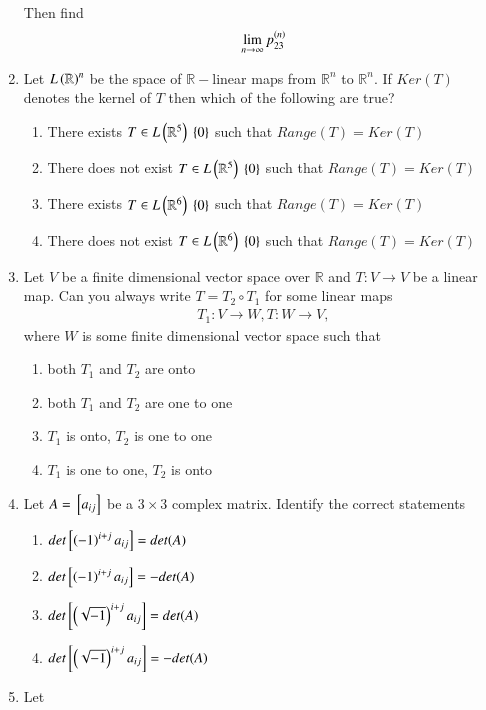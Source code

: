 \begin{enumerate}[label=\thesection.\arabic*.,ref=\thesection.\theenumi]
\begin{align}
\end{align}
Then find 
\begin{align}
\lim_{n \to \infty} p_{23}^{\left(n\right)}
\end{align}
\item Let $L\left(\mathbb{R}\right)^n$ be the space of $\mathbb{R}-$linear maps from $\mathbb{R}^n$ to $\mathbb{R}^n$.  If $Ker(T)$ denotes the kernel of $T$ then which of the following are true?
\begin{enumerate}
\item There exists $T \in L\left(\mathbb{R}^5\right)\ \left\{0\right\}$ such that $Range(T) = Ker(T)$
\item There does not exist $T \in L\left(\mathbb{R}^5\right)\ \left\{0\right\}$ such that $Range(T) = Ker(T)$
\item There exists $T \in L\left(\mathbb{R}^6\right)\ \left\{0\right\}$ such that $Range(T) = Ker(T)$
\item There does not exist $T \in L\left(\mathbb{R}^6\right)\ \left\{0\right\}$ such that $Range(T) = Ker(T)$
\end{enumerate}
\item Let $V$ be a finite dimensional vector space over $\mathbb{R}$ and $T:V\to V$ be a linear map.   Can you always write $T = T_2 \circ T_1$ for some linear maps
\begin{align}
T_1:V\to W, T:W\to V,
\end{align}
where $W$ is some finite dimensional vector space such that\begin{enumerate}
\item both $T_1$ and $T_2$ are onto
\item both $T_1$ and $T_2$ are one to one
\item $T_1$ is onto, $T_2$ is one to one
\item $T_1$ is one to one, $T_2$ is onto
\end{enumerate}
\item Let $A = {}\left[a_{ij}\right]$ be a $3\times 3$ complex matrix.  Identify the correct statements
\begin{enumerate}
\item $det{}\left[\left(-1\right)^{i+j}a_{ij}\right] = det(A)$
\item $det{}\left[\left(-1\right)^{i+j}a_{ij}\right] = -det(A)$
\item $det{}\left[\left(\sqrt{-1}\right)^{i+j}a_{ij}\right] = det(A)$
\item $det{}\left[\left(\sqrt{-1}\right)^{i+j}a_{ij}\right] = -det(A)$
\end{enumerate}
\item Let 
\begin{align}

\end{align}
\end{enumerate}
